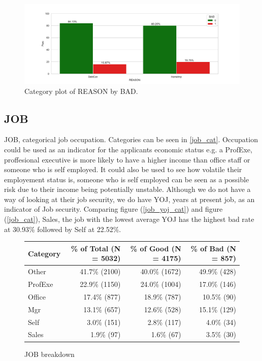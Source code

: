 \begin{figure}[!ht]
	\centering
	\includegraphics[scale=0.40]{figs/reason_cat.pdf}
	\caption{Category plot of REASON by BAD. \label{reason_cat}}
\end{figure}

\subsection*{JOB}

JOB,  categorical job occupation. Categories can be seen in \ref{job_cat}. Occupation could be used as an indicator for the applicants economic status e.g. a ProfExe,  proffesional executive is more likely to have a higher income than office staff or someone who is self employed. It could also be used to see how volatile their employement status is,  someone who is self employed can be seen as a possible risk due to their income being potentially unstable. Although we do not have a way of looking at their job security,  we do have YOJ,  years at present job,  as an indicator of Job security. Comparing figure (\ref{job_yoj_cat}) and figure (\ref{job_cat}),  Sales,  the job with the lowest average YOJ has the highest bad rate at 30.93\% followed by Self at 22.52\%. 

\begin{figure}[ht]
	\centering
	\renewcommand{\arraystretch}{2}
	\begin{tabular}{lrrr}
		\toprule
		Category & \% of Total (N = 5032) & \% of Good (N = 4175) & \% of Bad (N = 857) \\
		\midrule
		Other & 41.7\% (2100) & 40.0\% (1672) &  49.9\% (428)  \\
		ProfExe & 22.9\% (1150) & 24.0\% (1004) &  17.0\% (146)  \\
		Office & 17.4\% (877) & 18.9\% (787) &  10.5\% (90)  \\
		Mgr &  13.1\% (657) & 12.6\% (528) & 15.1\% (129)  \\
		Self & 3.0\% (151) & 2.8\% (117) &  4.0\% (34)  \\
		Sales & 1.9\% (97) & 1.6\% (67) &  3.5\% (30)  \\
		\bottomrule
	\end{tabular}
	\caption{JOB breakdown \label{job_count_tbl}}
\end{figure}

